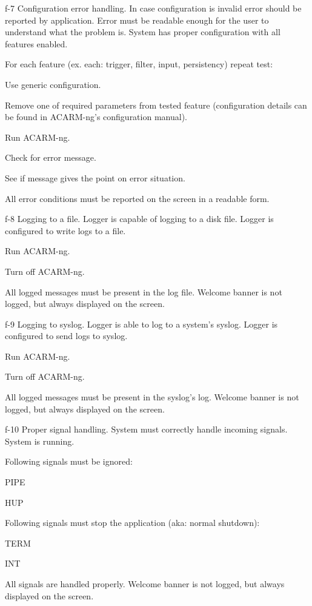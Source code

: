 \testCase
{f-7}
{Configuration error handling.}
{In case configuration is invalid error should be reported by application. Error must be readable enough for the user to understand what the problem is.}
{System has proper configuration with all features enabled.}
{
For each feature (ex. each: trigger, filter, input, persistency) repeat test:
\begin{enumerate*}
\item Use generic configuration.
\item Remove one of required parameters from tested feature (configuration details can be found in ACARM-ng's configuration manual).
\item Run ACARM-ng.
\item Check for error message.
\item See if message gives the point on error situation.
\end{enumerate*}
}
{All error conditions must be reported on the screen in a readable form.}
{}


\testCase
{f-8}
{Logging to a file.}
{Logger is capable of logging to a disk file.}
{Logger is configured to write logs to a file.}
{
\begin{enumerate*}
\item Run ACARM-ng.
\item Turn off ACARM-ng.
\end{enumerate*}
}
{All logged messages must be present in the log file.}
{Welcome banner is not logged, but always displayed on the screen.}


\testCase
{f-9}
{Logging to syslog.}
{Logger is able to log to a system's syslog.}
{Logger is configured to send logs to syslog.}
{
\begin{enumerate*}
\item Run ACARM-ng.
\item Turn off ACARM-ng.
\end{enumerate*}
}
{All logged messages must be present in the syslog's log.}
{Welcome banner is not logged, but always displayed on the screen.}


\testCase
{f-10}
{Proper signal handling.}
{System must correctly handle incoming signals.}
{System is running.}
{
Following signals must be ignored:
\begin{enumerate*}
\item PIPE
\item HUP
\end{enumerate*}
Following signals must stop the application (aka: normal shutdown):
\begin{enumerate*}
\item TERM
\item INT
\end{enumerate*}
}
{All signals are handled properly.}
{Welcome banner is not logged, but always displayed on the screen.}
